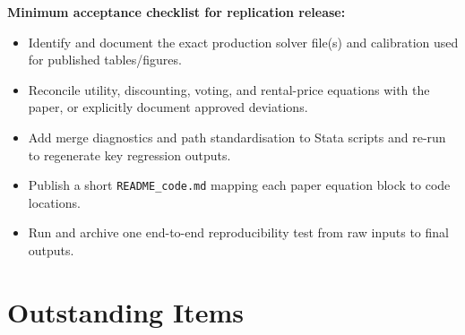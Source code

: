 \documentclass[11pt]{article}
\begin{document}
\medskip
\noindent\textbf{Minimum acceptance checklist for replication release:}
\begin{itemize}
  \item Identify and document the exact production solver file(s) and calibration
    used for published tables/figures.
  \item Reconcile utility, discounting, voting, and rental-price equations with
    the paper, or explicitly document approved deviations.
  \item Add merge diagnostics and path standardisation to Stata scripts and re-run
    to regenerate key regression outputs.
  \item Publish a short \texttt{README\_code.md} mapping each paper equation block
    to code locations.
  \item Run and archive one end-to-end reproducibility test from raw inputs to
    final outputs.
\end{itemize}

\section*{Outstanding Items}
\end{document}
